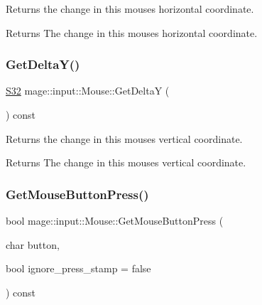 Returns the change in this mouse\textquotesingle{}s horizontal coordinate.

\begin{DoxyReturn}{Returns}
The change in this mouse\textquotesingle{}s horizontal coordinate. 
\end{DoxyReturn}
\mbox{\label{classmage_1_1input_1_1_mouse_a448886ed21c136f1a385101e21093aa3}} 
\subsubsection{\texorpdfstring{Get\+Delta\+Y()}{GetDeltaY()}}
{\footnotesize\ttfamily \mbox{\hyperlink{namespacemage_a642e05c5c83642b6946703615cdbf2da}{S32}} mage\+::input\+::\+Mouse\+::\+Get\+DeltaY (\begin{DoxyParamCaption}{ }\end{DoxyParamCaption}) const\hspace{0.3cm}{\ttfamily [noexcept]}}

Returns the change in this mouse\textquotesingle{}s vertical coordinate.

\begin{DoxyReturn}{Returns}
The change in this mouse\textquotesingle{}s vertical coordinate. 
\end{DoxyReturn}
\mbox{\label{classmage_1_1input_1_1_mouse_a1aed699ffd28b121e9da426113937f85}} 
\subsubsection{\texorpdfstring{Get\+Mouse\+Button\+Press()}{GetMouseButtonPress()}}
{\footnotesize\ttfamily bool mage\+::input\+::\+Mouse\+::\+Get\+Mouse\+Button\+Press (\begin{DoxyParamCaption}\item[{char}]{button,  }\item[{bool}]{ignore\+\_\+press\+\_\+stamp = {\ttfamily false} }\end{DoxyParamCaption}) const\hspace{0.3cm}{\ttfamily [noexcept]}}

